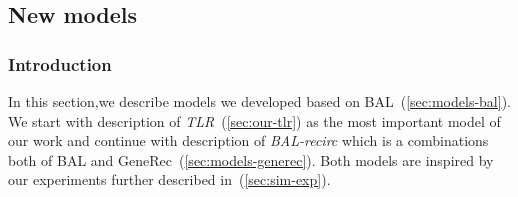 \subsection{New models}
\label{sec:sim-our} 

\subsubsection*{Introduction} 
In this section,we describe models we developed based on BAL~(\ref{sec:models-bal}). We start with description of \emph{TLR}~(\ref{sec:our-tlr}) as the most important model of our work and continue with description of \emph{BAL-recirc} which is a combinations both of BAL and GeneRec~(\ref{sec:models-generec}). Both models are inspired by our experiments further described in~(\ref{sec:sim-exp}). 

 



